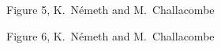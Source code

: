 \twolinestyle{\documentclass[prb,preprint]{revtex4}}
\begin{document}
{\clearpage

\begin{center}
Figure 5, K.~N\'emeth and M.~Challacombe \\[1.cm]
\end{center}

\clearpage

\begin{center}
Figure 6, K.~N\'emeth and M.~Challacombe \\[1.cm]
\end{center}

}
\end{document}

